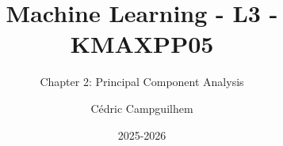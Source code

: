 \documentclass[10pt,handout]{beamer}  %
\title{Machine Learning - L3 - KMAXPP05}
\subtitle{Chapter 2: Principal Component Analysis}
\author{Cédric Campguilhem}
\institute[]{
	Airbus Operations \\
	\href{mailto:cedric.campguilhem@airbus.com}{\texttt{cedric.campguilhem@airbus.com}}
}
\date{2025-2026}
\begin{document}
	
	\begin{frame}
		\titlepage
	\end{frame}
	
	
	
	
	
	
	
	
\end{document}
